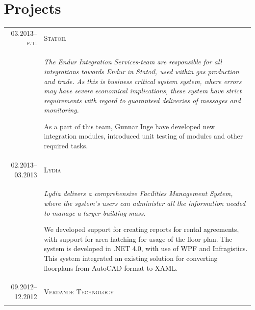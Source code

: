 \documentclass[a4paper,10pt]{article}
\begin{document}

\section{Projects}
\begin{longtable}{r|p{11cm}}

\textsc{03.2013--p.t.} & \textsc{Statoil} \\ &
\footnotesize{\textit{The Endur Integration Services-team are
    responsible for all integrations towards Endur in Statoil, used
    within gas production and trade. As this is business critical
    system system, where errors may have severe economical
    implications, these system have strict requirements with regard to
    guaranteed deliveries of messages and monitoring.}
\newline

As a part of this team, Gunnar Inge have developed new integration
modules, introduced unit testing of modules and other required tasks.} \\

\textsc{02.2013--03.2013} & \textsc{Lydia} \\
& \footnotesize{\textit{Lydia delivers a comprehensive Facilities
    Management System, where the system's users can administer all the
    information needed to manage a larger building mass.}
\newline

We developed support for creating reports for rental agreements, with
support for area hatching for usage of the floor plan. The system is developed in .NET 4.0, with use of WPF and Infragistics. This system integrated an existing solution for converting floorplans from AutoCAD format to XAML.} \\

\textsc{09.2012--12.2012} & \textsc{Verdande Technology} \\ &


\end{longtable}
\end{document}
